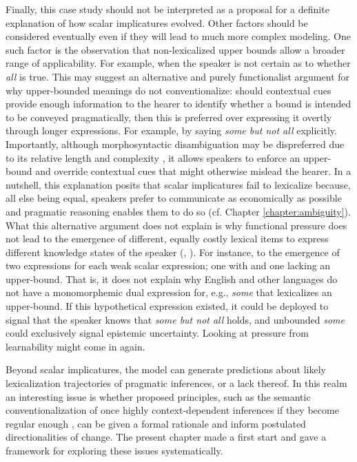 \documentclass[a4paper, 11pt]{article}
\theoremstyle{Satz}
\begin{document}
Finally, this case study should not be interpreted as a proposal for a definite explanation of
how scalar implicatures evolved. Other factors should be considered eventually even if they
will lead to much more complex modeling. One such factor is the observation that
non-lexicalized upper bounds allow a broader range of applicability. For example, when the speaker is
not certain as to whether \emph{all} is true. This may suggest an alternative and purely
functionalist argument for why upper-bounded meanings do not conventionalize: should contextual
cues provide enough information to the hearer to identify whether a bound is intended to be
conveyed pragmatically, then this is preferred over expressing it overtly through longer
expressions. For example, by saying {\em some but not all} explicitly. Importantly, although
morphosyntactic disambiguation may be dispreferred due to its relative length and complexity
\citep{piantadosi+etal:2012b}, it allows speakers to enforce an upper-bound and override
contextual cues that might otherwise mislead the hearer. In a nutshell, this explanation posits that scalar implicatures fail to lexicalize because, all else being equal, speakers prefer to communicate as economically as possible and pragmatic reasoning enables them to do so (cf. Chapter \ref{chapter:ambiguity}). What this alternative argument does not explain is why functional pressure does not lead to the emergence of different, equally costly lexical items to express different knowledge states of the speaker (\citealt[252-267]{horn:1984}, 
\citealt{horn:1972,traugott:2004,vdAuwera:2010}). For instance, to the emergence of two expressions for each weak scalar expression; one with and one lacking an upper-bound. That is, it does not explain why English and other languages do not have a monomorphemic dual expression for, e.g., {\em some} that lexicalizes an upper-bound. If this hypothetical expression existed, it could be deployed to signal that the speaker knows that {\em some but not all} holds, and unbounded {\em some} could exclusively signal epistemic uncertainty. Looking at pressure from learnability might come in again. 

Beyond scalar implicatures, the model can generate predictions about likely lexicalization trajectories of pragmatic inferences, or a lack thereof. In this realm an interesting issue is whether proposed principles, such as the semantic conventionalization of once highly context-dependent inferences if they become regular enough \citep{levinson:2000,traugott:2004}, can be given
a formal rationale and inform postulated directionalities of change. The present chapter made a first start and gave a framework for exploring these issues systematically.
\end{document}
